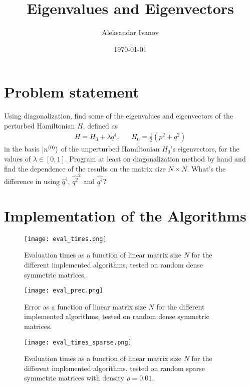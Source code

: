 \documentclass[10pt,a4paper,twocolumn]{article}
\begin{document}
\title{Eigenvalues and Eigenvectors}
\author{Aleksandar Ivanov}
\date{\today}
\maketitle


\section{Problem statement}

Using diagonalization, find some of the eigenvalues and eigenvectors of the perturbed Hamiltonian $H$, defined as
\begin{align}
H = H_0 + \lambda q^4,& &H_0 = \frac{1}{2} \left(p^2 + q^2 \right)
\end{align}
%
in the basis $\ket{n^{(0)}}$ of the unperturbed Hamiltonian $H_0$'s eigenvectors, for the values of $\lambda \in [0,1]$. Program at least on diagonalization method by hand and find the dependence of the results on the matrix size $N \times N$. What's the difference in using $\hat{q}^4$, $\hat{q^2}^2$ and $\hat{q^4}$?


\section{Implementation of the Algorithms}

\begin{figure}
\centering
\captionsetup{justification=centering}
\texttt{[image: eval\_times.png]}
\caption{Evaluation times as a function of linear matrix size $N$ for the different implemented algorithms, tested on random dense symmetric matrices.}
\label{fig:eval_times}
\end{figure}

\begin{figure}
\centering
\captionsetup{justification=centering}
\texttt{[image: eval\_prec.png]}
\caption{Error as a function of linear matrix size $N$ for the different implemented algorithms, tested on random dense symmetric matrices.}
\label{fig:eval_prec}
\end{figure}

\begin{figure}
\centering
\captionsetup{justification=centering}
\texttt{[image: eval\_times\_sparse.png]}
\caption{Evaluation times as a function of linear matrix size $N$ for the different implemented algorithms, tested on random sparse symmetric matrices with density $\rho=0.01$.}
\label{fig:eval_times_sparse}
\end{figure}
\end{document}
